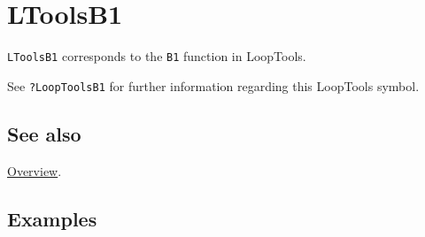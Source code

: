 \documentclass[../FeynHelpersManual.tex]{subfiles}
\begin{document}
\hypertarget{ltoolsb1}{
\section{LToolsB1}\label{ltoolsb1}}

\texttt{LToolsB1} corresponds to the \texttt{B1} function in LoopTools.

See \texttt{?LoopTools\textasciigrave B1} for further information
regarding this LoopTools symbol.

\subsection{See also}

\hyperlink{toc}{Overview}.

\subsection{Examples}
\end{document}
